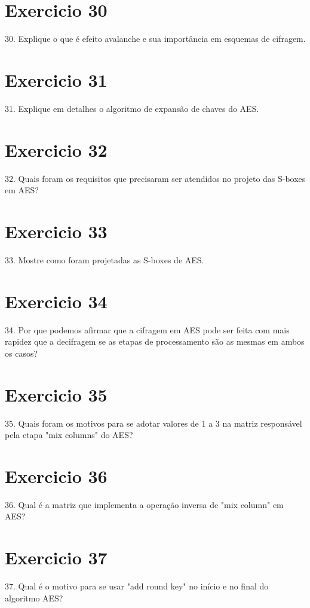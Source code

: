 \documentclass[10pt,a4paper]{report}
\begin{document}
\section{Exercicio 30}
30. Explique o que é efeito avalanche e sua importância em esquemas de cifragem.
\section{Exercicio 31}
31. Explique em detalhes o algoritmo de expansão de chaves do AES.
\section{Exercicio 32}
32. Quais foram os requisitos que precisaram ser atendidos no projeto das S-boxes em AES?
\section{Exercicio 33}
33. Mostre como foram projetadas as S-boxes de AES.
\section{Exercicio 34}
34. Por que podemos afirmar que a cifragem em AES pode ser feita com mais rapidez que a decifragem se as etapas de processamento são as mesmas em ambos os casos?
\section{Exercicio 35}
35. Quais foram os motivos para se adotar valores de 1 a 3 na matriz responsável pela etapa "mix columns" do AES?
\section{Exercicio 36}
36. Qual é a matriz que implementa a operação inversa de "mix column" em AES?
\section{Exercicio 37}
37. Qual é o motivo para se usar "add round key" no início e no final do algoritmo AES?
\end{document}
